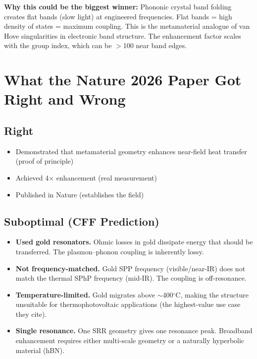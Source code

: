 \documentclass[11pt, a4paper]{article}
\begin{document}
\textbf{Why this could be the biggest winner:} Phononic
crystal band folding creates flat bands (slow light) at
engineered frequencies. Flat bands = high density of states
= maximum coupling. This is the metamaterial analogue of
van Hove singularities in electronic band structure. The
enhancement factor scales with the group index, which can
be $>$100 near band edges.

\section{What the Nature 2026 Paper Got Right and Wrong}

\subsection{Right}

\begin{itemize}[nosep]
  \item Demonstrated that metamaterial geometry enhances
        near-field heat transfer (proof of principle)
  \item Achieved 4$\times$ enhancement (real measurement)
  \item Published in Nature (establishes the field)
\end{itemize}

\subsection{Suboptimal (CFF Prediction)}

\begin{itemize}[nosep]
  \item \textbf{Used gold resonators.} Ohmic losses in gold
        dissipate energy that should be transferred. The
        plasmon--phonon coupling is inherently lossy.
  \item \textbf{Not frequency-matched.} Gold SPP frequency
        (visible/near-IR) does not match the thermal SPhP
        frequency (mid-IR). The coupling is off-resonance.
  \item \textbf{Temperature-limited.} Gold migrates above
        $\sim$400$^\circ$C, making the structure unsuitable
        for thermophotovoltaic applications (the highest-value
        use case they cite).
  \item \textbf{Single resonance.} One SRR geometry gives
        one resonance peak. Broadband enhancement requires
        either multi-scale geometry or a naturally hyperbolic
        material (hBN).
\end{itemize}
\end{document}
